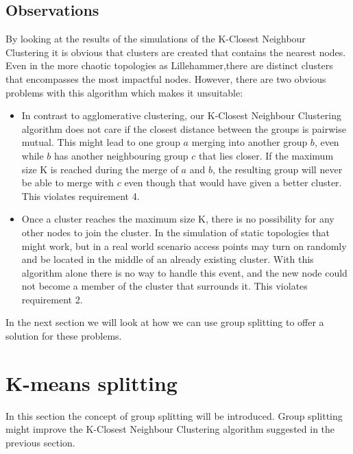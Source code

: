 \subsection{Observations}
By looking at the results of the simulations of the K-Closest Neighbour Clustering it is obvious that clusters are created that contains the nearest nodes.
Even in the more chaotic topologies as Lillehammer,there are distinct clusters that encompasses the most impactful nodes. However, there are two obvious problems with this algorithm
which makes it unsuitable:

\begin{itemize}
	\item In contrast to agglomerative clustering, our K-Closest Neighbour Clustering algorithm does not care if the closest distance between the groups is pairwise mutual. This
		might lead to one group $a$ merging into another group $b$, even while $b$ has another neighbouring group $c$ that lies closer. If the maximum size K is reached during the merge of
		$a$ and $b$,  the resulting group will never be able to merge with $c$ even though that would have given a better cluster. This violates requirement 4.
	\item Once a cluster reaches the maximum size K, there is no possibility for any other nodes to join the cluster.
		In the simulation of static topologies that might work, but in a real world scenario access points may turn on randomly and be located in the middle of an already existing cluster.
		With this algorithm alone there is no way to handle this event, and the new node could not become a member of the cluster that surrounds it. This violates requirement  2.
\end{itemize}

In the next section we will look at how we can use group splitting to offer a solution for these problems.

\section{K-means splitting}
In this section the concept of group splitting will be introduced. Group splitting might improve the K-Closest Neighbour Clustering algorithm suggested in the previous section.

